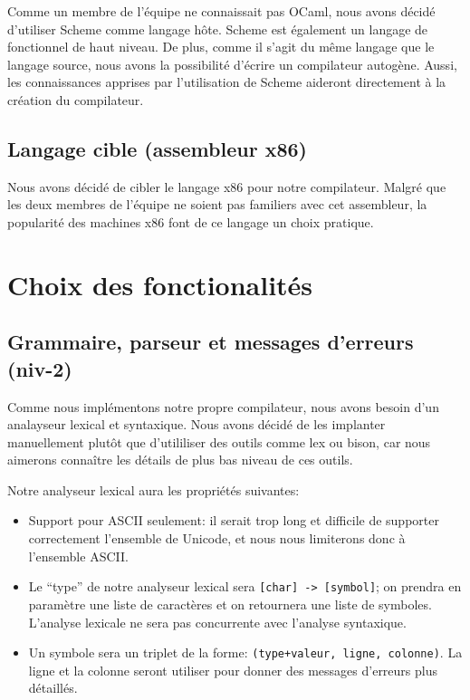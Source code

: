 \documentclass[11pt]{article}
\begin{document}
Comme un membre de l'équipe ne connaissait pas OCaml, nous avons
décidé d'utiliser Scheme comme langage hôte.  Scheme est également un
langage de fonctionnel de haut niveau.  De plus, comme il s'agit du
même langage que le langage source, nous avons la possibilité d'écrire
un compilateur autogène.  Aussi, les connaissances apprises par
l'utilisation de Scheme aideront directement à la création du
compilateur.


\subsection{Langage cible (assembleur x86)}

Nous avons décidé de cibler le langage x86 pour notre compilateur.
Malgré que les deux membres de l'équipe ne soient pas familiers avec
cet assembleur, la popularité des machines x86 font de ce langage un
choix pratique.


\section{Choix des fonctionalités}

\subsection{Grammaire, parseur et messages d'erreurs (niv-2)}

Comme nous implémentons notre propre compilateur, nous avons besoin
d'un analayseur lexical et syntaxique.  Nous avons décidé de les
implanter manuellement plutôt que d'utililiser des outils comme lex ou
bison, car nous aimerons connaître les détails de plus bas niveau de
ces outils.

Notre analyseur lexical aura les propriétés suivantes:


\begin{itemize}
\item Support pour ASCII seulement: il serait trop long et difficile
  de supporter correctement l'ensemble de Unicode, et nous nous
  limiterons donc à l'ensemble ASCII.
\item Le ``type'' de notre analyseur lexical sera \texttt{[char] ->
    [symbol]}; on prendra en paramètre une liste de caractères et on
  retournera une liste de symboles.  L'analyse lexicale ne sera pas
  concurrente avec l'analyse syntaxique.
\item Un symbole sera un triplet de la forme: \texttt{(type+valeur,
    ligne, colonne)}.  La ligne et la colonne seront utiliser pour
  donner des messages d'erreurs plus détaillés.
\end{itemize}
\end{document}
